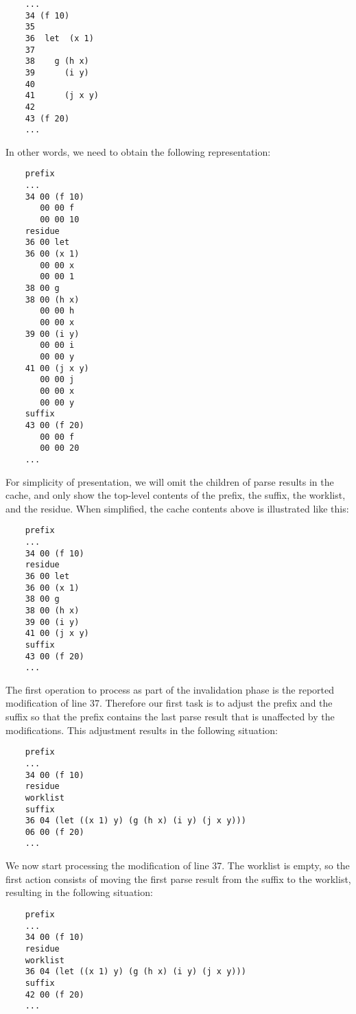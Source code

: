 {\small\begin{verbatim}
    ...
    34 (f 10)
    35
    36  let  (x 1)
    37
    38    g (h x)
    39      (i y)
    40
    41      (j x y)
    42
    43 (f 20)
    ...
\end{verbatim}}

In other words, we need to obtain the following representation:

{\small\begin{verbatim}
    prefix
    ...
    34 00 (f 10)
       00 00 f
       00 00 10
    residue
    36 00 let
    36 00 (x 1)
       00 00 x
       00 00 1
    38 00 g
    38 00 (h x)
       00 00 h
       00 00 x
    39 00 (i y)
       00 00 i
       00 00 y
    41 00 (j x y)
       00 00 j
       00 00 x
       00 00 y
    suffix
    43 00 (f 20)
       00 00 f
       00 00 20
    ...
\end{verbatim}}

For simplicity of presentation, we will omit the children of parse
results in the cache, and only show the top-level contents of the
prefix, the suffix, the worklist, and the residue.  When simplified,
the cache contents above is illustrated like this:

{\small\begin{verbatim}
    prefix
    ...
    34 00 (f 10)
    residue
    36 00 let
    36 00 (x 1)
    38 00 g
    38 00 (h x)
    39 00 (i y)
    41 00 (j x y)
    suffix
    43 00 (f 20)
    ...
\end{verbatim}}

The first operation to process as part of the invalidation phase is
the reported modification of line 37.  Therefore our first task is to
adjust the prefix and the suffix so that the prefix contains the last
parse result that is unaffected by the modifications.  This adjustment
results in the following situation:

{\small\begin{verbatim}
    prefix
    ...
    34 00 (f 10)
    residue
    worklist
    suffix
    36 04 (let ((x 1) y) (g (h x) (i y) (j x y)))
    06 00 (f 20)
    ...
\end{verbatim}}

We now start processing the modification of line 37.  The worklist is
empty, so the first action consists of moving the first parse result
from the suffix to the worklist, resulting in the following situation:

{\small\begin{verbatim}
    prefix
    ...
    34 00 (f 10)
    residue
    worklist
    36 04 (let ((x 1) y) (g (h x) (i y) (j x y)))
    suffix
    42 00 (f 20)
    ...
\end{verbatim}}

